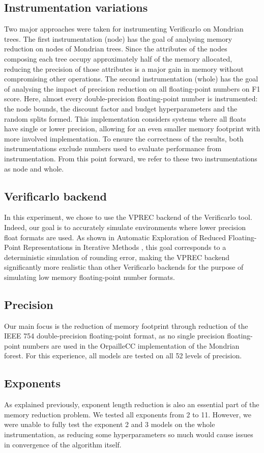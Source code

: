 \documentclass[conference]{IEEEtran}
\begin{document}
\subsection{Instrumentation variations}
Two major approaches were taken for instrumenting Verificarlo on Mondrian trees. 
The first instrumentation (node) has the goal of analysing memory reduction on nodes of Mondrian trees. Since the attributes of the nodes composing each tree occupy approximately half of the memory allocated, reducing the precision of those attributes is a major gain in memory without compromising other operations.
The second instrumentation (whole) has the goal of analysing the impact of precision reduction on all floating-point numbers on F1 score. Here, almost every double-precision floating-point number is instrumented: the node bounds, the discount factor and budget hyperparameters and the random splits formed. This implementation considers systems where all floats have single or lower precision, allowing for an even smaller memory footprint with more involved implementation. 
To ensure the correctness of the results, both instrumentations exclude numbers used to evaluate performance from instrumentation. From this point forward, we refer to these two instrumentations as node and whole.
\subsection{Verificarlo backend}
In this experiment, we chose to use the VPREC backend of the Verificarlo tool. Indeed, our goal is to accurately simulate environments where lower precision float formats are used. As shown in Automatic Exploration of Reduced Floating-Point Representations in Iterative Methods \cite{chatelain2019automatic}, this goal corresponds to a deterministic simulation of rounding error, making the VPREC backend significantly more realistic than other Verificarlo backends for the purpose of simulating low memory floating-point number formats.
\subsection{Precision}
Our main focus is the reduction of memory footprint through reduction of the IEEE 754 double-precision floating-point format, as no single precision floating-point numbers are used in the OrpailleCC implementation of the Mondrian forest. For this experience, all models are tested on all 52 levels of precision.
\subsection{Exponents}
As explained previously, exponent length reduction is also an essential part of the memory reduction problem. We tested all exponents from 2 to 11. However, we were unable to fully test the exponent 2 and 3 models on the whole instrumentation, as reducing some hyperparameters so much would cause issues in convergence of the algorithm itself.
\end{document}
